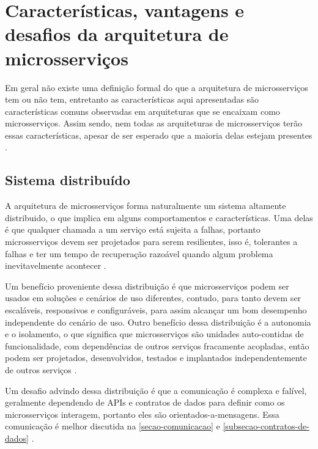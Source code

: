 \chapter{Características, vantagens e desafios da arquitetura de microsserviços}\label{chapter-caracteristicas}



Em geral não existe uma definição formal do que a arquitetura de microsserviços tem ou não tem, entretanto as características aqui apresentadas são características comuns observadas em arquiteturas que se encaixam como microsserviços. Assim sendo, nem todas as arquiteturas de microsserviços terão essas características, apesar de ser esperado que a maioria delas estejam presentes \cite{martin-fowler-microservices}.

\section{Sistema distribuído}
A arquitetura de microsserviços forma naturalmente um sistema altamente distribuido, o que implica em alguns comportamentos e características. Uma delas é que qualquer chamada a um serviço está sujeita a falhas, portanto microsserviços devem ser projetados para serem resilientes, isso é, tolerantes a falhas e ter um tempo de recuperação razoável quando algum problema inevitavelmente acontecer \cite{Familiar2015}.

Um benefício proveniente dessa distribuição é que microsserviços podem ser usados em soluções e cenários de uso diferentes, contudo, para tanto devem ser escaláveis, responsivos e configuráveis, para assim alcançar um bom desempenho independente do cenário de uso. Outro benefício dessa distribuição é a autonomia e o isolamento, o que significa que microsserviços são unidades auto-contidas de funcionalidade, com dependências de outros serviços fracamente acopladas, então podem ser projetados, desenvolvidos, testados e implantados independentemente de outros serviços \cite{martin-fowler-microservices,Familiar2015}.

Um desafio advindo dessa distribuição é que a comunicação é complexa e falível, geralmente dependendo de APIs e contratos de dados para definir como os microsserviços interagem, portanto eles são orientados-a-mensagens. Essa comunicação é melhor discutida na \autoref{secao-comunicacao} e \autoref{subsecao-contratos-de-dados} \cite{Familiar2015}. 


